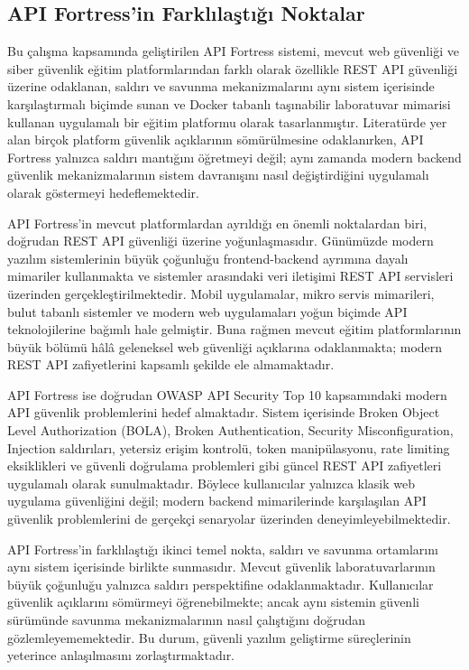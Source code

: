 \subsection{API Fortress'in Farklılaştığı Noktalar}
\label{api-fortress-in-farkl-la-t-noktalar}

Bu çalışma kapsamında geliştirilen API Fortress sistemi, mevcut web güvenliği ve siber güvenlik eğitim platformlarından farklı olarak özellikle REST API güvenliği üzerine odaklanan, saldırı ve savunma mekanizmalarını aynı sistem içerisinde karşılaştırmalı biçimde sunan ve Docker tabanlı taşınabilir laboratuvar mimarisi kullanan uygulamalı bir eğitim platformu olarak tasarlanmıştır. Literatürde yer alan birçok platform güvenlik açıklarının sömürülmesine odaklanırken, API Fortress yalnızca saldırı mantığını öğretmeyi değil; aynı zamanda modern backend güvenlik mekanizmalarının sistem davranışını nasıl değiştirdiğini uygulamalı olarak göstermeyi hedeflemektedir.

API Fortress’in mevcut platformlardan ayrıldığı en önemli noktalardan biri, doğrudan REST API güvenliği üzerine yoğunlaşmasıdır. Günümüzde modern yazılım sistemlerinin büyük çoğunluğu frontend-backend ayrımına dayalı mimariler kullanmakta ve sistemler arasındaki veri iletişimi REST API servisleri üzerinden gerçekleştirilmektedir. Mobil uygulamalar, mikro servis mimarileri, bulut tabanlı sistemler ve modern web uygulamaları yoğun biçimde API teknolojilerine bağımlı hale gelmiştir. Buna rağmen mevcut eğitim platformlarının büyük bölümü hâlâ geleneksel web güvenliği açıklarına odaklanmakta; modern REST API zafiyetlerini kapsamlı şekilde ele almamaktadır.

API Fortress ise doğrudan OWASP API Security Top 10 kapsamındaki modern API güvenlik problemlerini hedef almaktadır. Sistem içerisinde Broken Object Level Authorization (BOLA), Broken Authentication, Security Misconfiguration, Injection saldırıları, yetersiz erişim kontrolü, token manipülasyonu, rate limiting eksiklikleri ve güvenli doğrulama problemleri gibi güncel REST API zafiyetleri uygulamalı olarak sunulmaktadır. Böylece kullanıcılar yalnızca klasik web uygulama güvenliğini değil; modern backend mimarilerinde karşılaşılan API güvenlik problemlerini de gerçekçi senaryolar üzerinden deneyimleyebilmektedir.

API Fortress’in farklılaştığı ikinci temel nokta, saldırı ve savunma ortamlarını aynı sistem içerisinde birlikte sunmasıdır. Mevcut güvenlik laboratuvarlarının büyük çoğunluğu yalnızca saldırı perspektifine odaklanmaktadır. Kullanıcılar güvenlik açıklarını sömürmeyi öğrenebilmekte; ancak aynı sistemin güvenli sürümünde savunma mekanizmalarının nasıl çalıştığını doğrudan gözlemleyememektedir. Bu durum, güvenli yazılım geliştirme süreçlerinin yeterince anlaşılmasını zorlaştırmaktadır.

